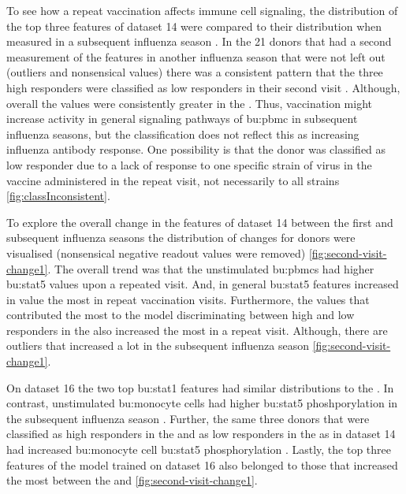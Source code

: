 To see how a repeat vaccination affects immune cell signaling, the distribution of the top three features of dataset 14 were compared to their distribution when measured in a subsequent influenza season .
In the 21 donors that had a second measurement of the features in another influenza season that were not left out (outliers and nonsensical values) there was a consistent pattern that the three high responders were classified as low responders in their second visit .
Although, overall the values were consistently greater in the \secondvis {}.
Thus, vaccination might increase activity in general signaling pathways of \gls{bu:pbmc} in subsequent influenza seasons, but the classification does not reflect this as increasing influenza antibody response.
One possibility is that the donor was classified as low responder due to a lack of response to one specific strain of virus in the vaccine administered in the repeat visit, not necessarily to all strains \autoref{fig:classInconsistent}.

To explore the overall change in the features of dataset 14 between the first and subsequent influenza seasons the distribution of changes for donors were visualised (nonsensical negative readout values were removed) \autoref{fig:second-visit-change1}.
The overall trend was that the unstimulated \gls{bu:pbmc}s had higher \gls{bu:stat}5 values upon a repeated visit.
And, in general \gls{bu:stat}5 features increased in value the most in repeat vaccination visits.
Furthermore, the values that contributed the most to the model discriminating between high and low responders in the \firstvis also increased the most in a repeat visit.
Although, there are outliers that increased a lot in the subsequent influenza season \autoref{fig:second-visit-change1}.

On dataset 16 the two top \gls{bu:stat}1 features had similar distributions to the \firstvis {}.
In contrast, unstimulated \gls{bu:monocyte} cells had higher \gls{bu:stat}5 phoshporylation in the subsequent influenza season .
Further, the same three donors that were classified as high responders in the \firstvis and as low responders in the \secondvis as in dataset 14  had increased \gls{bu:monocyte} cell \gls{bu:stat}5 phosphorylation .
Lastly, the top three features of the model trained on dataset 16 also belonged to those that increased the most between the \firstvis and \secondvis \autoref{fig:second-visit-change1}.

